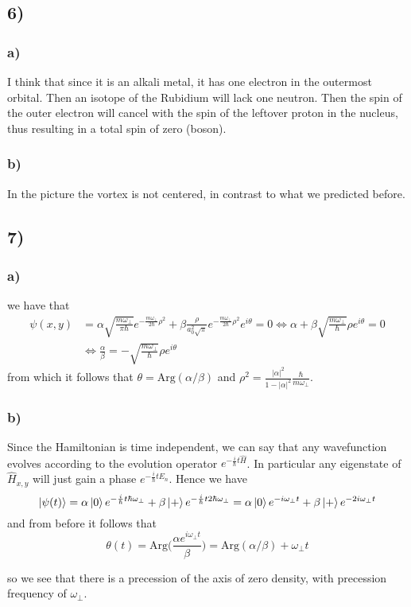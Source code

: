 \documentclass[10pt,a4paper]{book}
\begin{document}
\subsection*{6)}

\subsubsection*{a)}

I think that since it is an alkali metal, it has one electron in the outermost orbital. Then an isotope of the Rubidium will lack one neutron. Then the spin of the outer electron will cancel with the spin of the leftover proton in the nucleus, thus resulting in a total spin of zero (boson).

\subsubsection*{b)}
In the picture the vortex is not centered, in contrast to what we predicted before. 

\subsection*{7)}

\subsubsection*{a)}
we have that 
\begin{align*}
\psi(x,y)&=\alpha \sqrt{\frac{m\omega_{\perp}}{\pi \hbar}}e^{-\frac{m\omega_{\perp}}{2\hbar}\rho^2}+\beta\frac{\rho}{a_0^2\sqrt{\pi}}e^{-\frac{m\omega_{\perp}}{2\hbar}\rho^2}e^{i\theta}=0\Leftrightarrow 
\alpha+\beta\sqrt{\frac{m\omega_{\perp}}{\hbar}}\rho e^{i\theta}=0\\
&\Leftrightarrow \frac{\alpha}{\beta}=-\sqrt{\frac{m\omega_{\perp}}{\hbar}}\rho e^{i\theta}
\end{align*}
from which it follows that $\theta=\text{Arg}(\alpha/\beta)$ and $\rho^2=\frac{|\alpha|^2}{1-|\alpha|^2}\frac{\hbar}{m\omega_{\perp}}$.

\subsubsection*{b)}
Since the Hamiltonian is time independent, we can say that any wavefunction evolves according to the evolution operator $e^{-\frac{i}{\hbar}t\hat{H}}$. In particular any eigenstate of $\hat{H}_{x,y}$ will just gain a phase $e^{-\frac{i}{\hbar}tE_n}$. Hence we have
$$\ket{\psi(t)}=\alpha\ket{0}e^{-\frac{i}{\hbar}t\hbar\omega_{\perp}}+\beta\ket{+}e^{-\frac{i}{\hbar}t2\hbar \omega_{\perp}}=\alpha\ket{0}e^{-i\omega_{\perp}t}+\beta\ket{+}e^{-2i\omega_{\perp}t}$$
and from before it follows that 
$$\theta(t)=\text{Arg}\bigg(\frac{\alpha e^{i\omega_{\perp} t}}{\beta}\bigg)=\text{Arg}(\alpha/\beta)+\omega_{\perp}t$$


so we see that there is a precession of the axis of zero density, with precession frequency of $\omega_{\perp}$. 
\end{document}
